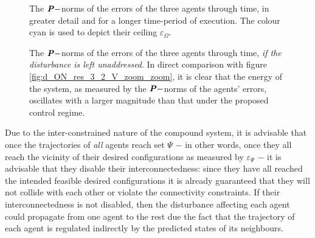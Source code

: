 \begin{figure}[H]\centering
  \scalebox{0.7}{}
  \caption{The $\bm{\mathit{P}}-$norms of the errors of the three agents through time,
    in greater detail and for a longer time-period of execution. The colour
    cyan is used to depict their ceiling $\varepsilon_{\Omega}$.}
  \label{fig:d_ON_res_3_2_V_zoom_zoom}
\end{figure}

\begin{figure}[H]\centering
  \scalebox{0.7}{}
  \caption{The $\bm{\mathit{P}}-$norms of the errors of the three agents through time,
    \textit{if the disturbance is left unaddressed}. In direct comparison with figure
    \eqref{fig:d_ON_res_3_2_V_zoom_zoom}, it is clear that the energy of the
    system, as measured by the $\bm{\mathit{P}}-$norms of the agents' errors, oscillates
    with a larger magnitude than that under the proposed control regime.}
  \label{fig:d_ON_res_3_2_V_zoom_zoom_unattenuated}
\end{figure}

Due to the inter-constrained nature of the compound system, it is advisable that
once the trajectories of \textit{all} agents reach set $\Psi$ $-$ in other
words, once they all reach the vicinity of their desired configurations as
measured by $\varepsilon_{\Psi}$ $-$ it is advisable that they disable their
interconnectedness: since they have all reached the intended feasible
desired configurations it is already guaranteed that they will not collide with
each other or violate the connectivity constraints. If their interconnectedness
is not disabled, then the disturbance affecting each agent could propagate
from one agent to the rest due the fact that the trajectory of each agent
is regulated indirectly by the predicted states of its neighbours.
